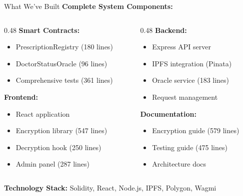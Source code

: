 \documentclass[10pt]{beamer}
\begin{document}
\begin{frame}{What We've Built}
\textbf{Complete System Components:}

\begin{columns}[T]
\begin{column}{0.48\textwidth}
\textbf{Smart Contracts:}
\begin{itemize}
\item PrescriptionRegistry (180 lines)
\item DoctorStatusOracle (96 lines)
\item Comprehensive tests (361 lines)
\end{itemize}

\textbf{Frontend:}
\begin{itemize}
\item React application
\item Encryption library (547 lines)
\item Decryption hook (250 lines)
\item Admin panel (287 lines)
\end{itemize}
\end{column}

\begin{column}{0.48\textwidth}
\textbf{Backend:}
\begin{itemize}
\item Express API server
\item IPFS integration (Pinata)
\item Oracle service (183 lines)
\item Request management
\end{itemize}

\textbf{Documentation:}
\begin{itemize}
\item Encryption guide (579 lines)
\item Testing guide (475 lines)
\item Architecture docs
\end{itemize}
\end{column}
\end{columns}

\vspace{0.3cm}
\textbf{Technology Stack:} Solidity, React, Node.js, IPFS, Polygon, Wagmi
\end{frame}
\end{document}
